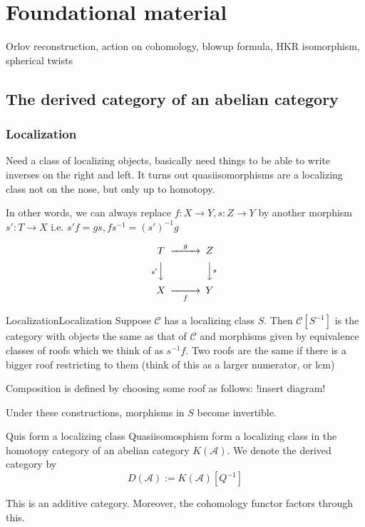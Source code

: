\section{Foundational material}
 Orlov reconstruction, action on cohomology, blowup formula, HKR isomorphism, spherical twists

\subsection{The derived category of an abelian category}
\subsubsection{Localization}

Need a class of localizing objects, basically need things to be able to write inverses on the right and left. It turns out quasiisomorphisms are a localizing class not on the nose, but only up to homotopy.

In other words, we can always replace $f:X\rightarrow Y, s:Z\rightarrow Y$ by another morphism $s':T\rightarrow X$ i.e.  $s'f=gs,fs^{-1}=(s')^{-1}g$

$$\begin{CD} T @>g>> Z \\ @Vs'VV @VVsV \\ X @> >f > Y\end{CD}$$

\begin{definition}{Localization}{Localization}
    Suppose $\mathcal{C}$ has a localizing class $S$. Then $\mathcal{C}[S^{-1}]$ is the category with objects the same as that of $\mathcal{C}$ and morphisms given by equivalence classes of roofs which we think of as $s^{-1}f$. Two roofs are the same if there is a bigger roof restricting to them (think of this as a larger numerator, or lcm)
\end{definition}

Composition is defined by choosing some roof as follows: !insert diagram!
 
Under these constructions, morphisms in $S$ become invertible. 

\begin{theorem}{}{Quis form a localizing class}
    Quasiisomosphism form a localizing class in the homotopy category of an abelian category $K(\mathcal{A})$. We denote the derived category by$$D(\mathcal{A}):=K(\mathcal{A})[Q^{-1}]$$
\end{theorem}

This is an additive category. Moreover, the cohomology functor factors through this.

